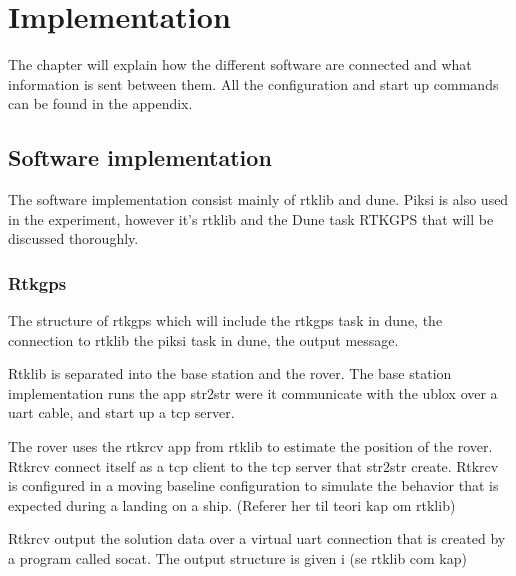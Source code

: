 \chapter{Implementation}
The chapter will explain how the different software are connected and what information is sent between them. All the configuration and start up commands can be found in the appendix.
\section{Software implementation}
The software implementation consist mainly of rtklib and dune. Piksi is also used in the experiment, however it's rtklib and the Dune task RTKGPS that will be discussed thoroughly.
\subsection{Rtkgps}
The structure of rtkgps which will include the rtkgps task in dune, the connection to rtklib the piksi task in dune, the output message.

Rtklib is separated into the base station and the rover. The base station implementation runs the app str2str were it communicate with the ublox over a uart cable, and start up a tcp server.

The rover uses the rtkrcv app from rtklib to estimate the position of the rover. Rtkrcv connect itself as a tcp client to the tcp server that str2str create. Rtkrcv is configured in a moving baseline configuration to simulate the behavior that is expected during a landing on a ship. (Referer her til teori kap om rtklib)

Rtkrcv output the solution data over a virtual uart connection that is created by a program called socat. The output structure is given i (se rtklib com kap)

